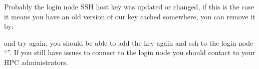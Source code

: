 Probably the login node SSH host key was updated or changed,  if this is the case it means you have an old 
version of our key cached somewhere, you can remove it by:

\begin{prompt}
\end{prompt}

and try again, you should be able to add the key again and ssh to the login node ``\strong{\emph{\loginnode}}''.
If you still have issues to connect to the login node you should contact to your HPC administrators.

